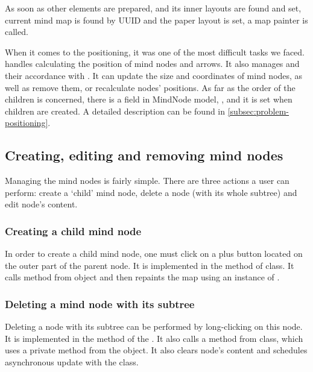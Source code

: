 As soon as other elements are prepared,  and its inner  layouts are found and set, current mind map is found by UUID and the paper layout is set, a map painter is called.

When it comes to the positioning, it was one of the most difficult tasks we faced.  handles calculating the position of mind nodes and arrows. It also manages  and their accordance with . It can update the size and coordinates of mind nodes, as well as remove them, or recalculate nodes' positions. As far as the order of the children is concerned, there is a field in MindNode model, , and it is set when children are created. A detailed description can be found in \cref{subsec:problem-positioning}.

\subsection{Creating, editing and removing mind nodes}
\label{subsec:creating-mm}
Managing the mind nodes is fairly simple. There are three actions a user can perform: create a `child' mind node, delete a node (with its whole subtree) and edit node's content. 

\subsubsection{Creating a child mind node}
\label{subsubsec:create-child}
In order to create a child mind node, one must click on a plus button located on the outer part of the parent node. It is implemented in the  method of  class. It calls  method from  object and then repaints the map using an instance of .

\subsubsection{Deleting a mind node with its subtree}
\label{subsubsec:delete-node}

Deleting a node with its subtree can be performed by long-clicking on this node. It is implemented in the  method of the . It also calls a  method from  class, which uses  a private method from the  object. It also clears node's content and schedules asynchronous update with the  class.
 
